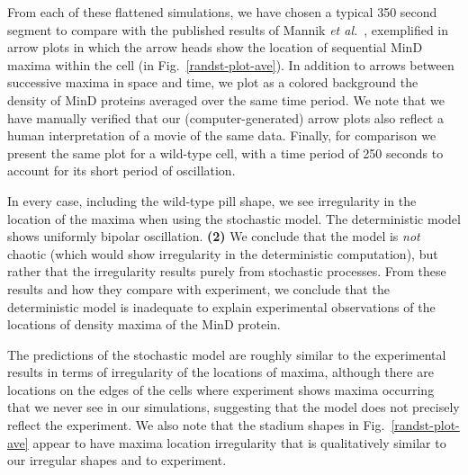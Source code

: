\documentclass[10pt,letterpaper]{article}
\newcommand{\fixme}[1]{\red{[#1]}}
\newcommand{\red}[1]{{\bf \color{red} #1}}
\newcommand{\blue}[1]{{\bf \color{blue} #1}}
\begin{document}
From each of these flattened simulations, we have chosen a typical 350
second segment to compare with the published results of
Mannik \emph{et al.}~\cite{mannik2012robustness}, exemplified in arrow plots in
which the arrow heads show the location of sequential MinD maxima
within the cell (in Fig.~\ref{randst-plot-ave}).  In addition to
arrows between successive maxima in space and time, we plot as a
colored background the density of MinD proteins averaged over the same
time period.  We note that we have manually verified that our
(computer-generated) arrow plots also reflect a human interpretation
of a movie of the same data.  Finally, for comparison we present the
same plot for a wild-type cell, with a time period of 250 seconds to
account for its short period of oscillation.

In every case, including the wild-type pill shape, we see irregularity
in the location of the maxima when using the stochastic model.  The
deterministic model shows uniformly bipolar oscillation.  \blue{(2)}
We conclude that the model is \emph{not} chaotic (which would show
irregularity in the deterministic computation), but rather that the
irregularity results purely from stochastic processes.  From these
results and how they compare with experiment, we conclude that the
deterministic model is inadequate to explain experimental observations
of the locations of density maxima of the MinD protein.


The predictions of the stochastic model are roughly similar to the
experimental results in terms of irregularity of the locations of
maxima, although there are locations on the edges of the cells where
experiment shows maxima occurring that we never see in our simulations,
suggesting that the model does not precisely reflect the experiment.
We also note that the stadium shapes in Fig.~\ref{randst-plot-ave}
appear to have maxima location irregularity that is qualitatively
similar to our irregular shapes and to experiment.
\end{document}
